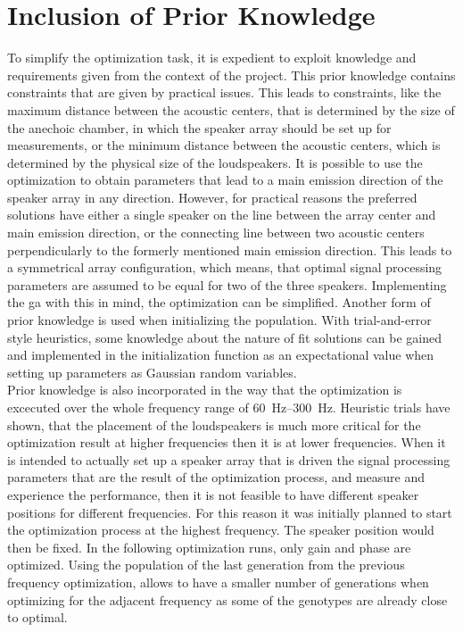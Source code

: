 \section{Inclusion of Prior Knowledge}\label{sec:ga_prior}
To simplify the optimization task, it is expedient to exploit knowledge and requirements given from the context of the project. This prior knowledge contains constraints that are given by practical issues. This leads to constraints, like the maximum distance between the acoustic centers, that is determined by the size of the anechoic chamber, in which the speaker array should be set up for measurements, or the minimum distance between the acoustic centers, which is determined by the physical size of the loudspeakers. It is possible to use the optimization to obtain parameters that lead to a main emission direction of the speaker array in any direction. However, for practical reasons the preferred solutions have either a single speaker on the line between the array center and main emission direction, or the connecting line between two acoustic centers perpendicularly to the formerly mentioned main emission direction. This leads to a symmetrical array configuration, which means, that optimal signal processing parameters are assumed to be equal for two of the three speakers. Implementing the \gls{ga} with this in mind, the optimization can be simplified.
Another form of prior knowledge is used when initializing the population. With trial-and-error style heuristics, some knowledge about the nature of fit solutions can be gained and implemented in the initialization function as an expectational value when setting up parameters as Gaussian random variables.\\
Prior knowledge is also incorporated in the way that the optimization is excecuted over the whole frequency range of \SIrange{60}{300}{\hertz}. Heuristic trials have shown, that the placement of the loudspeakers is much more critical for the optimization result at higher frequencies then it is at lower frequencies. When it is intended to actually set up a speaker array that is driven the signal processing parameters that are the result of the optimization process, and measure and experience the performance, then it is not feasible to have different speaker positions for different frequencies. For this reason it was initially planned to start the optimization process at the highest frequency. The speaker position would then be fixed. In the following optimization runs, only gain and phase are optimized. Using the population of the last generation from the previous frequency optimization, allows to have a smaller number of generations when optimizing for the adjacent frequency as some of the genotypes are already close to optimal. 
